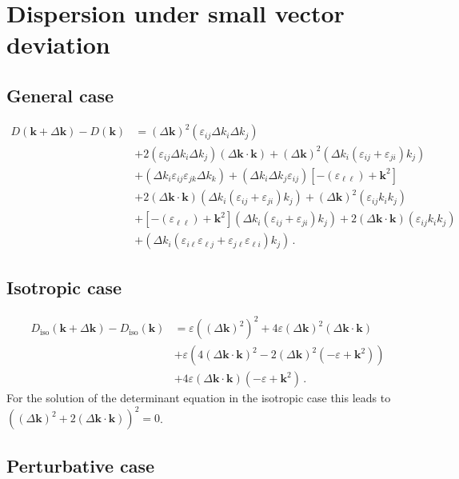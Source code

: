 \documentclass[12pt,a4paper,twoside,openright,BCOR10mm,headsepline,titlepage,abstracton,chapterprefix,final]{scrreprt}
\newcommand{\vct}[1]{\mathbf{#1}}
\newcommand{\eps}[1]{\varepsilon_{#1}}
\newcommand{\scpm}[2]{{(#1\cdot#2)}}
\begin{document}
\section{Dispersion under small vector deviation}

\subsection{General case}

\begin{align}
 D(\vct{k} + \Delta \vct{k}) - D(\vct{k}) &= (\Delta \vct{k})^2 (\eps{ij} \Delta k_i \Delta k_j)\nonumber\\&
 + 2 (\eps{ij} \Delta k_i \Delta k_j) \scpm{\Delta \vct{k}}{\vct{k}} + (\Delta \vct{k})^2 (\Delta k_i (\eps{ij} + \eps{ji}) k_j)\nonumber\\&
 + (\Delta k_i \eps{ij} \eps{jk} \Delta k_k) + (\Delta k_i \Delta k_j \eps{ij})[-(\eps{\ell\ell}) + \vct{k}^2]\nonumber\\&
 + 2 \scpm{\Delta \vct{k}}{\vct{k}} (\Delta k_i (\eps{ij} + \eps{ji}) k_j) + (\Delta \vct{k})^2 (\eps{ij} k_i k_j)\nonumber\\&
 + [-(\eps{\ell\ell}) + \vct{k}^2](\Delta k_i (\eps{ij} + \eps{ji}) k_j) + 2 \scpm{\Delta \vct{k}}{\vct{k}} (\eps{ij} k_i k_j)\nonumber\\&
 + (\Delta k_i (\eps{i\ell}\eps{\ell j} + \eps{j\ell}\eps{\ell i}) k_j)\,.
\end{align}


\subsection{Isotropic case}

\begin{align}
 D_\text{iso}(\vct{k} + \Delta \vct{k}) - D_\text{iso}(\vct{k}) &= \varepsilon ((\Delta \vct{k})^2)^2 
 + 4 \varepsilon (\Delta \vct{k})^2 \scpm{\Delta \vct{k}}{\vct{k}}\nonumber\\&
 + \varepsilon \left(4 \scpm{\Delta \vct{k}}{\vct{k}}^2 -2 (\Delta \vct{k})^2 (-\varepsilon + \vct{k}^2)\right)\nonumber\\&
 + 4 \varepsilon \scpm{\Delta \vct{k}}{\vct{k}}(-\varepsilon + \vct{k}^2)\,.
\end{align}
For the solution of the determinant equation in the isotropic case this leads to 
$((\Delta \vct{k})^2 + 2 \scpm{\Delta \vct{k}}{\vct{k}})^2 = 0$.

\subsection{Perturbative case}
\end{document}
